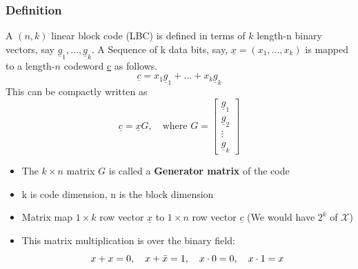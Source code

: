 \documentclass[12pt]{article}
\begin{document}
\subsubsection{Definition}
A $(n,k)$ linear block code (LBC) is defined in terms of $k$ length-n binary vectors, say $\underline{g}_1,...,\underline{g}_k$. A Sequence of k data bits, say, $\underline{x}= ({x}_1,...,{x}_k)$ is mapped to a length-$n$ codeword \underline{c} as follows.
\[
\underline{c} = x_1\underline{g}_1+...+x_k\underline{g}_k
\]
This can be compactly written as 
\[
\underline{c} = \underline{x}G, \quad \textrm{where } G=\begin{bmatrix}
\underline{g}_1\\
\underline{g}_2\\
\vdots \\
\underline{g}_k
\end{bmatrix}
\]
\begin{itemize}
    \item The $k \times n$ matrix $G$ is called a \textbf{Generator matrix } of the code 
    \item k is code dimension, n is the block dimension
    \item Matrix map $1 \times k$ row vector $\underline{x}$ to $1 \times n$ row vector $\underline{c}$ (We would have $2^k$ of $\mathcal{X}$)
    \item This matrix multiplication is over the binary field:
    \[
    x + x = 0,\quad x + \Bar{x} = 1, \quad x\cdot 0=0, \quad x\cdot 1 = x
    \]
\end{itemize}
\end{document}
